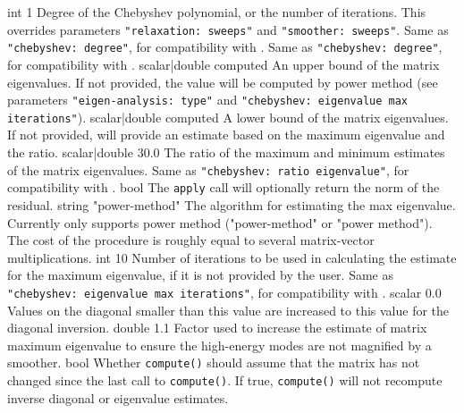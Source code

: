     {int}
    {1}
    {Degree of the Chebyshev polynomial, or the number of iterations. This
     overrides parameters {\tt "relaxation: sweeps"} and {\tt "smoother: sweeps"}.}
    {Same as {\tt "chebyshev: degree"}, for compatibility with \ifpack{}.}
    {Same as {\tt "chebyshev: degree"}, for compatibility with \ml{}.}
    {scalar|double}
    {computed}
    {An upper bound of the matrix eigenvalues. If not provided, the value will
     be computed by power method (see parameters {\tt "eigen-analysis: type"} and
     {\tt "chebyshev: eigenvalue max iterations"}).}
    {scalar|double}
    {computed}
    {A lower bound of the matrix eigenvalues.  If not provided, \ifpacktwo{}
     will provide an estimate based on the maximum eigenvalue and the ratio.}
    {scalar|double}
    {30.0}
    {The ratio of the maximum and minimum estimates of the matrix
     eigenvalues.}
    {Same as {\tt "chebyshev: ratio eigenvalue"}, for compatibility with \ml{}.}
    {bool}
    {\false}
    {The \texttt{apply} call will optionally return the norm of the residual.}
    {string}
    {"power-method"}
    {The algorithm for estimating the max eigenvalue. Currently only supports
     power method ("power-method" or "power method"). The cost of the procedure is
     roughly equal to several matrix-vector multiplications.}
    {int}
    {10}
    {Number of iterations to be used in calculating the estimate for the maximum
     eigenvalue, if it is not provided by the user.}
    {Same as {\tt "chebyshev: eigenvalue max iterations"}, for compatibility with \ml{}.}
    {scalar}
    {0.0}
    {Values on the diagonal smaller than this value are increased to this value
     for the diagonal inversion.}
    {double}
    {1.1}
    {Factor used to increase the estimate of matrix maximum eigenvalue to ensure
    the high-energy modes are not magnified by a smoother.}
    {bool}
    {\false}
    {Whether \texttt{compute()} should assume that the matrix has not changed
     since the last call to \texttt{compute()}. If true, \texttt{compute()}
     will not recompute inverse diagonal or eigenvalue estimates.}
